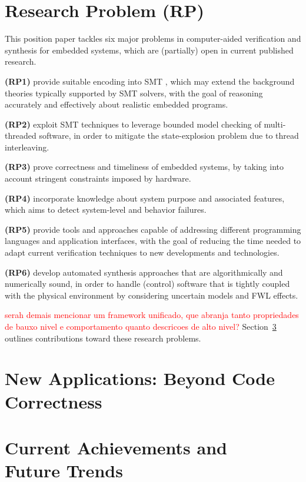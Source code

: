 \documentclass{acm_sen_article}
\begin{document}
\section{Research Problem (RP)}
\label{Research-Problem}

This position paper tackles six major problems in computer-aided verification and synthesis for embedded systems, which are (partially) open in current published research.

\textbf{(RP1)} provide suitable encoding into SMT \cite{BarrettSST09}, which may extend the background theories typically supported by SMT solvers, with the goal of reasoning accurately and effectively about realistic embedded programs.

\textbf{(RP2)} exploit SMT techniques to leverage bounded model checking of multi-threaded software, in order to mitigate the state-explosion problem due to thread interleaving.
	
\textbf{(RP3)} prove correctness and timeliness of embedded systems, by taking into account stringent constraints imposed by hardware.
	
\textbf{(RP4)} incorporate knowledge about system purpose and associated features, which aims to detect system-level and behavior failures.

\textbf{(RP5)} provide tools and approaches capable of addressing different programming languages and application interfaces, with the goal of reducing the time needed to adapt current verification techniques to new developments and technologies.

\textbf{(RP6)} develop automated synthesis approaches that are algorithmically and numerically sound, in order to handle (control) software that is tightly coupled with the physical environment by considering uncertain models and FWL effects.

\textcolor{red}{serah demais mencionar um framework unificado, que abranja tanto propriedades de bauxo nivel e comportamento quanto descricoes de alto nivel?}
Section~\ref{achievements} outlines contributions toward these research problems.

\section{New Applications: Beyond Code Correctness}
\label{Newapp}


\section{Current Achievements and \\ Future Trends}
\label{achievements}
\end{document}
